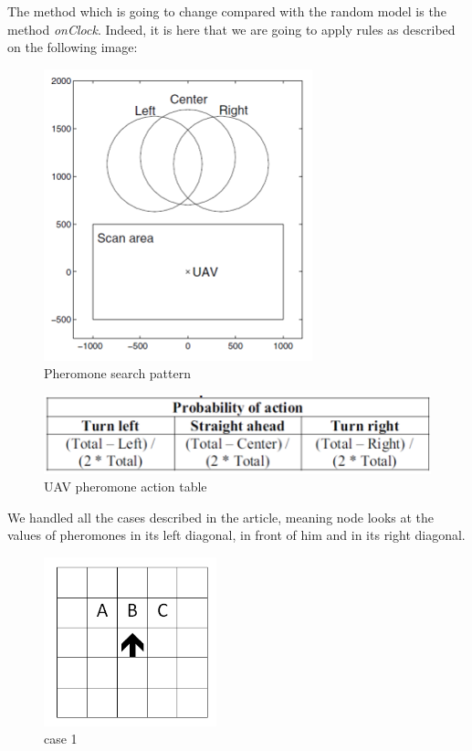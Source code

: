 The method which is going to change compared with the random model is the method \textit{onClock}. Indeed, it is here that we are going to apply rules as described on the following image:

\newpage

\begin{figure}[!h]
\center
\includegraphics{../images/pheromon_model.png}
\caption{Pheromone search pattern\cite{UAV}}
\end{figure}

\begin{figure}[!h]
\center
\includegraphics{../images/pheromone_table.png}
\caption{UAV pheromone action table\cite{UAV}}
\end{figure}

We handled all the cases described in the article, meaning node looks at the values of pheromones in its left diagonal, in front of him and in its right diagonal.

\newpage

\begin{figure}[!h]
\center
\includegraphics[width=5cm]{../images/grille_case_1.png}
\caption{\label{case1}case 1}
\end{figure}

